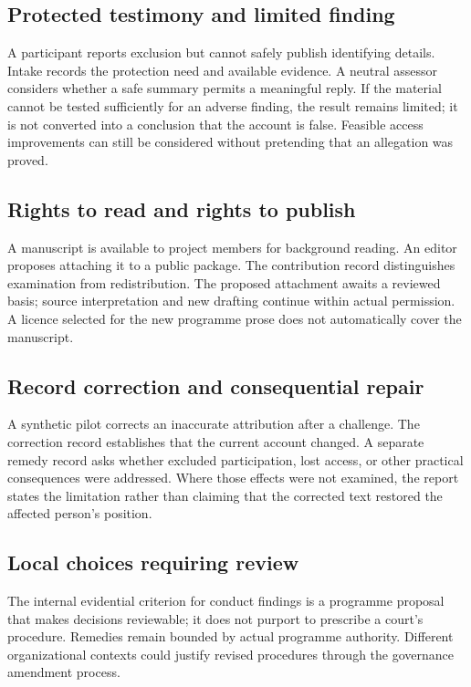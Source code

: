 \documentclass[11pt,a4paper]{article}
\begin{document}
\subsection{Protected testimony and limited finding}
A participant reports exclusion but cannot safely publish identifying details. Intake records the protection need and available evidence. A neutral assessor considers whether a safe summary permits a meaningful reply. If the material cannot be tested sufficiently for an adverse finding, the result remains limited; it is not converted into a conclusion that the account is false. Feasible access improvements can still be considered without pretending that an allegation was proved.

\subsection{Rights to read and rights to publish}
A manuscript is available to project members for background reading. An editor proposes attaching it to a public package. The contribution record distinguishes examination from redistribution. The proposed attachment awaits a reviewed basis; source interpretation and new drafting continue within actual permission. A licence selected for the new programme prose does not automatically cover the manuscript.

\subsection{Record correction and consequential repair}
A synthetic pilot corrects an inaccurate attribution after a challenge. The correction record establishes that the current account changed. A separate remedy record asks whether excluded participation, lost access, or other practical consequences were addressed. Where those effects were not examined, the report states the limitation rather than claiming that the corrected text restored the affected person's position.

\subsection{Local choices requiring review}
The internal evidential criterion for conduct findings is a programme proposal that makes decisions reviewable; it does not purport to prescribe a court's procedure. Remedies remain bounded by actual programme authority. Different organizational contexts could justify revised procedures through the governance amendment process.
\end{document}
